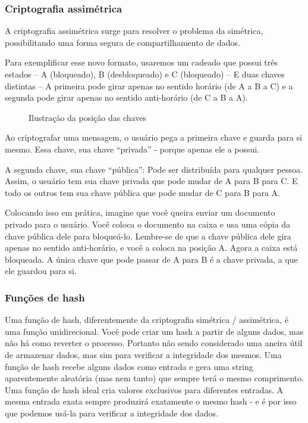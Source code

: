\subsubsection{Criptografia assimétrica}
A criptografia assimétrica surge para resolver o problema da simétrica, possibilitando uma forma segura de compartilhamento de dados.

Para exemplificar esse novo formato, usaremos um cadeado que possui três estados – A (bloqueado), B (desbloqueado) e C (bloqueado) – E duas chaves distintas – A primeira pode girar apenas no sentido horário (de A a B a C) e a segunda pode girar apenas no sentido anti-horário (de C a B a A).

\vspace{1cm}
\begin{figure}[H] \centering 
  \caption{\label{fig:5} Ilustração da posição das chaves} 
\end{figure}

Ao criptografar uma mensagem, o usuário pega a primeira chave e guarda para si mesmo. Essa chave, sua chave ``privada'' - porque apenas ele a possui.

A segunda chave, sua chave ``pública'': Pode ser distribuída para qualquer pessoa. Assim, o usuário tem sua chave privada que pode mudar de A para B para C. E todo os outros tem sua chave pública que pode mudar de C para B para A.

Colocando isso em prática, imagine que você queira enviar um documento privado para o usuário. Você coloca o documento na caixa e usa uma cópia da chave pública dele para bloqueá-lo. Lembre-se de que a chave pública dele gira apenas no sentido anti-horário, e você a coloca na posição A. Agora a caixa está bloqueada. A única chave que pode passar de A para B é a chave privada, a que ele guardou para si.

\subsubsection{Funções de hash}
Uma função de hash, diferentemente da criptografia simétrica / assimétrica, é  uma função unidirecional.  Você  pode criar um hash a partir de alguns dados, mas não há como reverter o processo. Portanto não sendo considerado uma aneira útil de armazenar dados, mas sim para verificar a integridade dos mesmos.  Uma função de hash recebe alguns dados como entrada e gera uma string aparentemente aleatória (mas nem tanto) que sempre terá o mesmo comprimento. Uma função de hash ideal cria valores exclusivos para diferentes entradas. A mesma entrada exata sempre produzirá exatamente o mesmo hash - e é por isso que podemos usá-la para verificar a integridade dos dados.

